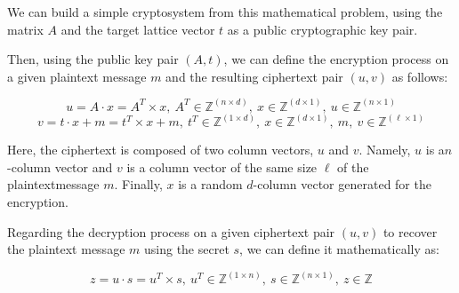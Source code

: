 \documentclass[runningheads]{llncs}
\numberwithin{equation}{section}
\begin{document}
    We can build a simple cryptosystem from this mathematical problem, using the matrix $A$ and the target lattice vector $t$ as a public cryptographic key pair.

    \vspace{2ex}
    
    \noindent Then, using the public key pair $(A,t)$, we can define the encryption process on a given plaintext message $m$ and the resulting ciphertext pair $(u,v)$ as follows:

    $$ u = A \cdot x = {A}^{T} \times x,\ {A}^{T} \in {\mathbb{Z}}^{(n \times d)},\ x \in {\mathbb{Z}}^{(d \times 1)},\ u \in {\mathbb{Z}}^{(n \times 1)} $$
    $$ v = t \cdot x + m = {t}^{T} \times x + m,\ {t}^{T} \in {\mathbb{Z}}^{(1 \times d)},\ x \in {\mathbb{Z}}^{(d \times 1)},\ m,\ v \in {\mathbb{Z}}^{(\ell \times 1)} $$

    \vspace{1ex}
    
    \noindent Here, the ciphertext is composed of two column vectors, $u$ and $v$. Namely, $u$ is a\break $n$-column vector and $v$ is a column vector of the same size $\ell$ of the plaintext\break message $m$. Finally, $x$ is a random $d$-column vector generated for the encryption.

    \clearpage
    
    \noindent Regarding the decryption process on a given ciphertext pair $(u,v)$ to recover the plaintext message $m$ using the secret $s$, we can define it mathematically as:

    $$ z = u \cdot s = {u}^{T} \times s,\ {u}^{T} \in {\mathbb{Z}}^{(1 \times n)},\ s \in {\mathbb{Z}}^{(n \times 1)},\ z \in \mathbb{Z} $$
    
\end{document}
